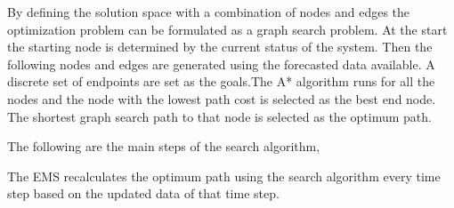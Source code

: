 By defining the solution space with a combination of nodes and edges the optimization problem can be formulated as a graph search problem. At the start the starting node is determined by the current status of the system. Then the following nodes and edges are generated using the forecasted data available. A discrete set of endpoints are set as the goals.The A*  algorithm runs for all the nodes and the node with the lowest path cost is selected as the best end node. The shortest graph search path to that node is selected as the optimum path.

The following are the main steps of the search algorithm,


The EMS recalculates the optimum path using the search algorithm every time step based on the updated data of that time step.

